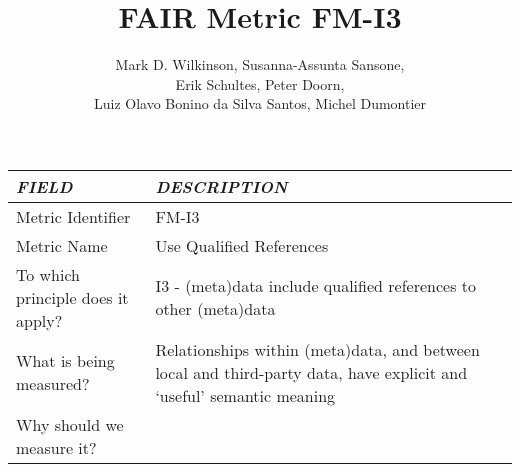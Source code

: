 \documentclass[english]{article}
\begin{document}
\title{FAIR Metric FM-I3}

\author{Mark D. Wilkinson, Susanna-Assunta Sansone, \\Erik Schultes, Peter Doorn,\\ 
Luiz Olavo Bonino da Silva Santos, Michel Dumontier}

\maketitle

\newpage





\begin{longtable}{|p{5cm}|p{9cm}|}


\hline
\emph{FIELD} & \emph{DESCRIPTION} \\
\hline
Metric Identifier &   FM-I3
\\


\hline
Metric Name &   



Use Qualified References


 \\



\hline
To which principle does it apply? &   


I3 - (meta)data include qualified references to other (meta)data

\\



\hline
What is being measured? & 


Relationships within (meta)data, and between local and third-party data, have explicit and ‘useful’ semantic meaning


\\



\hline
Why should we measure it? & 



\end{longtable}
\end{document}
